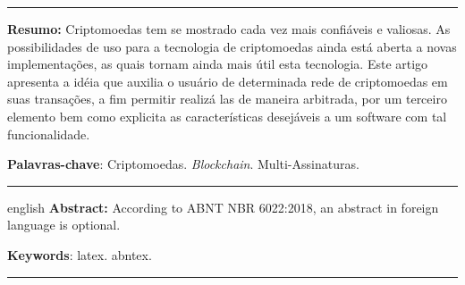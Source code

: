 \documentclass[
	article,			%
	11pt,				%
	oneside,			%
	a4paper,			%
	chapter=TITLE,		%
	section=TITLE,		%
	subsection=TITLE,	%
	subsubsection=TITLE, %
	english,			%
	brazil,				%
	sumario=tradicional
	]{ifrs-artigo-abntex2}
\begin{document}

\frenchspacing 


%
%

\imprimircapa
\hrule
\renewcommand{\resumoname}{}
\begin{resumo}
\textbf{Resumo:} Criptomoedas tem se mostrado cada vez mais confiáveis e valiosas. As possibilidades de uso para a tecnologia de criptomoedas ainda está aberta a novas implementações, as quais tornam ainda mais útil esta tecnologia. Este artigo apresenta a idéia que auxilia o usuário de determinada rede de criptomoedas em suas transações, a fim permitir realizá las de maneira arbitrada, por um terceiro elemento bem como explicita as características desejáveis a um software com tal funcionalidade.
 
 \vspace{\onelineskip}
 
 \noindent
 \textbf{Palavras-chave}: Criptomoedas. \textit{Blockchain}. Multi-Assinaturas.
\end{resumo}
\hrule

\renewcommand{\resumoname}{}
\begin{resumoumacoluna}
 \begin{otherlanguage*}{english}
   \textbf{Abstract:} According to ABNT NBR 6022:2018, an abstract in foreign language is optional.

   \vspace{\onelineskip}
 
   \noindent
   \textbf{Keywords}: latex. abntex.
 \end{otherlanguage*}  
\end{resumoumacoluna}
\hrule

\end{document}
